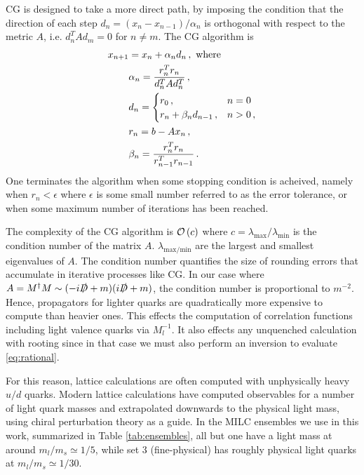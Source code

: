 CG is designed to take a more direct path, by imposing the condition that the direction of each step $d_n=(x_n-x_{n-1})/\alpha_n$ is orthogonal with respect to the metric $A$, i.e. $d^T_n A d_m = 0$ for $n\neq m$. The CG algorithm is
\begin{align}
  \nonumber
  x_{n+1} &= x_n + \alpha_n d_n\,, \text{ where } \\
  \nonumber
  &\alpha_n = {r^T_n r_n \over d^T_n A d_n^T}\,, \\
  \nonumber
  &d_n=
  \begin{cases}
    r_0\,, &  n=0 \\
    r_{n} + \beta_n d_{n-1}\,, & n>0\,,
  \end{cases} \\
  \nonumber
  &r_n = b - Ax_n\,, \\
  &\beta_n = {r^T_n r_n \over r^T_{n-1}r_{n-1}}\,.
  \label{eq:CG}
\end{align}
One terminates the algorithm when some stopping condition is acheived, namely when $r_n < \epsilon$ where $\epsilon$ is some small number referred to as the error tolerance, or when some maximum number of iterations has been reached.

The complexity of the CG algorithm is $\mathcal{O}\left( c \right)$ where $c=\lambda_{\text{max}}/\lambda_{\text{min}}$ is the condition number of the matrix $A$. $\lambda_{\text{max/min}}$ are the largest and smallest eigenvalues of $A$. The condition number quantifies the size of rounding errors that accumulate in iterative processes like CG. In our case where $A=M^{\dagger}M  \sim(-i\slashed{D}+m)(i\slashed{D}+m)$, the condition number is proportional to $m^{-2}$. Hence, propagators for lighter quarks are quadratically more expensive to compute than heavier ones. This effects the computation of correlation functions including light valence quarks via $M_l^{-1}$. It also effects any unquenched calculation with rooting since in that case we must also perform an inversion to evaluate \eqref{eq:rational}.

For this reason, lattice calculations are often computed with unphysically heavy $u/d$ quarks. Modern lattice calculations have computed observables for a number of light quark masses and extrapolated downwards to the physical light mass, using chiral perturbation theory as a guide. In the MILC ensembles we use in this work, summarized in Table \ref{tab:ensembles}, all but one have a light mass at around $m_l/m_s \simeq 1/5$, while set 3 (fine-physical) has roughly physical light quarks at $m_l/m_s \simeq 1/30$.


